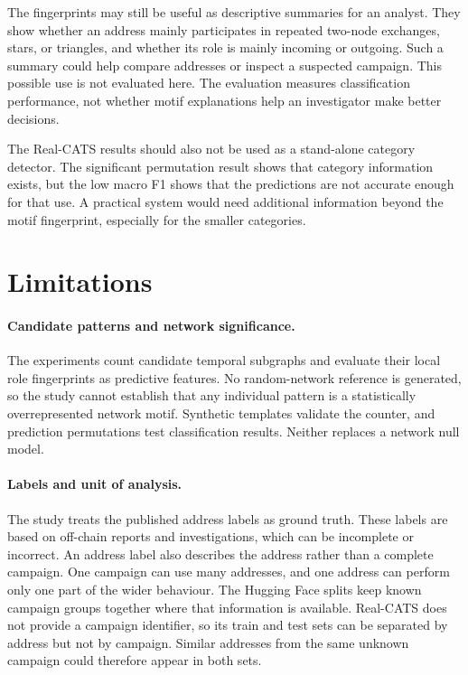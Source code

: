 \documentclass{thesisclass}
\begin{document}
The fingerprints may still be useful as descriptive summaries for an analyst.
They show whether an address mainly participates in repeated two-node exchanges,
stars, or triangles, and whether its role is mainly incoming or outgoing. Such a
summary could help compare addresses or inspect a suspected campaign. This
possible use is not evaluated here. The evaluation measures classification
performance, not whether motif explanations help an investigator make better
decisions.

The Real-CATS results should also not be used as a stand-alone category detector.
The significant permutation result shows that category information exists, but
the low macro F1 shows that the predictions are not accurate enough for that use.
A practical system would need additional information beyond the motif
fingerprint, especially for the smaller categories.

\section{Limitations}

\paragraph{Candidate patterns and network significance.}
The experiments count candidate temporal subgraphs and evaluate their local
role fingerprints as predictive features. No random-network reference is
generated, so the study cannot establish that any individual pattern is a
statistically overrepresented network motif. Synthetic templates validate the
counter, and prediction permutations test classification results. Neither
replaces a network null model.

\paragraph{Labels and unit of analysis.}
The study treats the published address labels as ground truth. These labels are
based on off-chain reports and investigations, which can be incomplete or
incorrect. An address label also describes the address rather than a complete
campaign. One campaign can use many addresses, and one address can perform only
one part of the wider behaviour. The Hugging Face splits keep known campaign
groups together where that information is available. Real-CATS does not provide
a campaign identifier, so its train and test sets can be separated by address
but not by campaign. Similar addresses from the same unknown campaign could
therefore appear in both sets.
\end{document}

